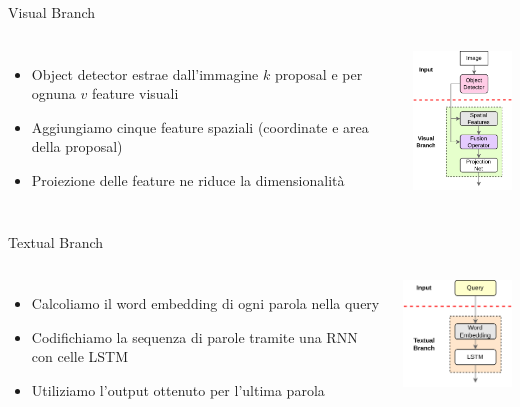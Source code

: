 \documentclass{beamer}
\begin{document}
\begin{frame}{Visual Branch}
  \begin{columns}
      \begin{itemize}
        \item Object detector estrae dall'immagine $k$ proposal e per
        ognuna $v$ \alert{feature visuali}
        \item Aggiungiamo cinque \alert{feature spaziali} (coordinate e
        area della proposal)
        \item \alert{Proiezione} delle feature ne riduce la dimensionalità
      \end{itemize}
      \centering
      \includegraphics[width=3.5cm]{images/visual-branch.png}
  \end{columns}
\end{frame}

\begin{frame}{Textual Branch}
  \begin{columns}
      \begin{itemize}
        \item Calcoliamo il \alert{word embedding} di ogni parola nella query
        \item Codifichiamo la \alert{sequenza} di parole tramite una RNN con celle LSTM
        \item Utiliziamo l'output ottenuto per \alert{l'ultima} parola
      \end{itemize}
      \centering
      \includegraphics[width=3.5cm]{images/textual-branch.png}
  \end{columns}
\end{frame}
\end{document}
